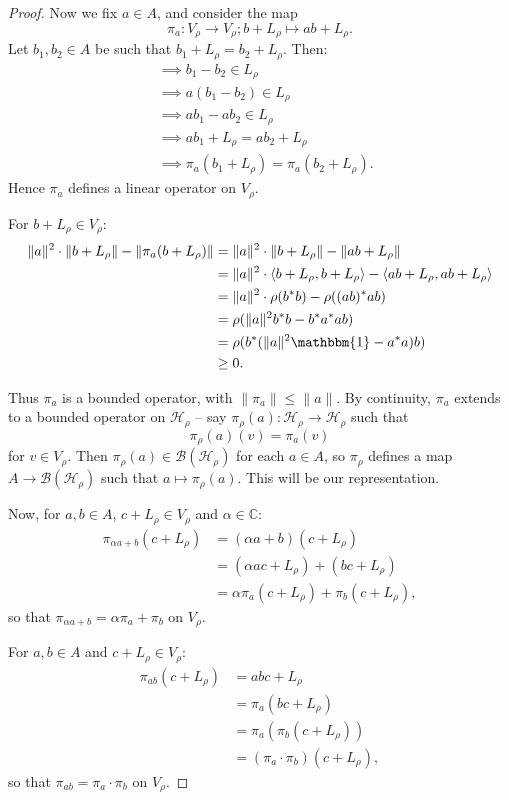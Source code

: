 \documentclass[12pt,a4paper]{amsart}
\theoremstyle{plain}
\theoremstyle{definition}
\newcommand{\B}{\mathcal{B}}
\newcommand{\Hr}{\mathcal{H}_\rho}
\newcommand{\1}{\mathbbm{1}}
\newcommand{\Vr}{V_\rho}
\newcommand{\Lr}{L_\rho}
\begin{document}
\begin{proof}
	Now we fix $a \in A$, and consider the map 
	\[
		\pi_a : V_\rho \to V_\rho; b+L_\rho \mapsto ab+L_\rho.
	\]
	Let $b_1, b_2 \in A$ be such that $b_1+L_\rho = b_2+L_\rho$. Then:
	\begin{align*}
		&\implies	b_1-b_2 \in L_\rho										\\	
		&\implies	a(b_1-b_2) \in L_\rho									\\	
		&\implies	ab_1-ab_2 \in L_\rho									\\	
		&\implies	ab_1 + L_\rho = ab_2+L_\rho								\\	
		&\implies	\pi_a(b_1+L_\rho) = \pi_a(b_2+L_\rho).
	\end{align*}
	Hence $\pi_a$ defines a linear operator on $V_\rho$.
	
	For $b+L_\rho \in V_\rho$:
	\begin{align*}
				\|a\|^2 \cdot \|b+L_\rho\| - \| \pi_a(b+L_\rho) \|
		&=		\|a\|^2 \cdot \|b+L_\rho\| - \| ab+L_\rho \|				\\
		&=		\|a\|^2 \cdot \langle b+L_\rho,b+L_\rho \rangle - 
									\langle ab+L_\rho,ab+L_\rho \rangle		\\
		&=		\|a\|^2 \cdot \rho(b^\ast b) - \rho ((ab)^\ast ab)			\\
		&= 		\rho (\|a\|^2 b^\ast b-b^\ast a^\ast ab)					\\
		&=		\rho (b^\ast (\|a\|^{2} \mathbbm{1} - a ^\ast a)b)			\\
		&\geq 	0.
	\end{align*}
	
	Thus $\pi_a$ is a bounded operator, with $\|\pi_a\| \leq \|a\|$. By continuity,  %
	$\pi_a$ extends to a bounded operator on $\Hr$ -- say $\pi_\rho(a):\Hr \to \Hr$ 
	such that \[ \pi_\rho(a)(v) = \pi_a(v) \] for $v\in \Vr$. 
	Then $\pi_\rho(a) \in \B(\Hr)$ for each $a \in A$, so $\pi_\rho$ defines a map 
	$A \to \B(\Hr)$ such that $ a \mapsto \pi_\rho(a)$. This will be our representation.
	
	Now, for $a,b \in A$, $c+ L_\rho \in \Vr$ and $\alpha \in \mathbb{C}$:
	\begin{align*}
				\pi_{\alpha a+b}(c+\Lr)
		&=		(\alpha a+b) (c+\Lr)										\\
		&=		(\alpha ac +\Lr) + (bc+\Lr)									\\
		&=		\alpha \pi_a (c+\Lr) + \pi_b(c+\Lr),
	\end{align*}
	so that $\pi_{\alpha a + b} = \alpha \pi_a +\pi_b$ on $\Vr$.
	
	For $a,b \in A$ and $c+ L_\rho \in \Vr$:
	\begin{align*}
		\pi_{ab}(c+\Lr)
		&=		abc+\Lr														\\
		&=		\pi_a (bc+\Lr)												\\
		&=		\pi_a (\pi_b (c+\Lr))										\\
		&=		(\pi_a \cdot \pi_b) (c+\Lr),
	\end{align*}
	so that $\pi_{a b} = \pi_a \cdot \pi_b$ on $\Vr$.
	

\end{proof}
\end{document}
